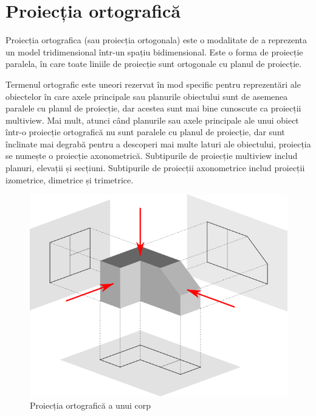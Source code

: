\newpage
\section{Proiecția ortografică}

Proiecția ortografica (sau proiecția ortogonala) este o modalitate de a reprezenta un model tridimensional  
într-un spațiu bidimensional. Este o forma de proiecție paralela, în care toate liniile de proiecție sunt ortogonale 
cu planul de proiecție.\newline

Termenul ortografic este uneori rezervat în mod specific pentru reprezentări ale obiectelor în care axele principale 
sau planurile obiectului sunt de asemenea paralele cu planul de proiecție, dar acestea sunt mai bine cunoscute 
ca proiecții multiview. Mai mult, atunci când planurile sau axele principale ale unui obiect într-o proiecție 
ortografică nu sunt paralele cu planul de proiecție, dar sunt înclinate mai degrabă pentru a descoperi mai 
multe laturi ale obiectului, proiecția se numește o proiecție axonometrică. Subtipurile de proiecție multiview 
includ planuri, elevații și secțiuni. Subtipurile de proiecții axonometrice includ proiecții izometrice, dimetrice și trimetrice. \newline

\begin{figure}[H]
  \begin{center}
      \includegraphics[scale=0.5]{imagini/proiectie/ortografica.png}
      \caption{Proiecția ortografică a unui corp}
      \label{fig:tabs}
  \end{center}    
\end{figure}

